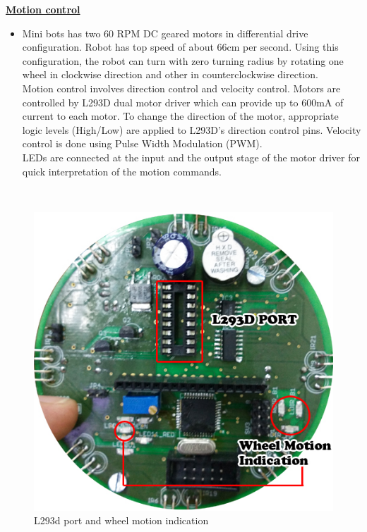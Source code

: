 \documentclass[a4paper,12pt,oneside]{book}
\begin{document}
	\underline{\textbf{\Large{Motion control}}}
	\begin{itemize}
	\item {Mini bots has two 60 RPM DC geared motors in differential drive configuration. Robot has top speed of about 66cm per second. Using this
		configuration, the robot can turn with zero turning radius by rotating one wheel in clockwise
		direction and other in counterclockwise direction.\\
		Motion control involves direction control and velocity control. Motors are controlled by L293D
		dual motor driver which can provide up to 600mA of current to each motor. To change the
		direction of the motor, appropriate logic levels (High/Low) are applied to L293D’s direction
		control pins. Velocity control is done using Pulse Width Modulation (PWM).\\
		LEDs are connected at the input and the output stage of the motor driver for quick interpretation
		of the motion commands.}
	\end{itemize}
	\hfill\\
	\begin{figure}[h!]
		\caption{L293d port and wheel motion indication}
		\includegraphics[width=\textwidth]{./HardwareManual/WheelMotionIndication_L293D.jpg}
	\end{figure}
	\hfill\\
		
\end{document}
